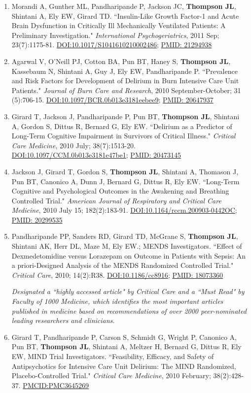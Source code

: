 \documentclass[5pt]{article}
\begin{document}
\begin{enumerate}
\item Morandi A, Gunther ML, Pandharipande P, Jackson JC, \textbf{Thompson JL}, Shintani A, Ely EW, Girard TD. ``Insulin-Like Growth Factor-1 and Acute Brain Dysfunction in Critically Ill Mechanically Ventilated Patients: A Preliminary Investigation." \emph{International Psychogeriatrics}, 2011 Sep; 23(7):1175-81. \href{https://doi.org/10.1017/S1041610210002486}{DOI:10.1017/S1041610210002486}; \href{https://www.ncbi.nlm.nih.gov/pubmed/21294938}{PMID: 21294938}
\item Agarwal V, O'Neill PJ, Cotton BA, Pun BT, Haney S, \textbf{Thompson JL}, Kassebaum N, Shintani A, Guy J, Ely EW, Pandharipande P. ``Prevalence and Risk Factors for Development of Delirium in Burn Intensive Care Unit Patients." \emph{Journal of Burn Care and Research}, 2010 September-October; 31 (5):706-15. \href{https://doi.org/10.1097/BCR.0b013e3181eebee9}{DOI:10.1097/BCR.0b013e3181eebee9}; \href{https://www.ncbi.nlm.nih.gov/pubmed/20647937}{PMID: 20647937}
\item Girard T, Jackson J, Pandharipande P, Pun BT, \textbf{Thompson JL}, Shintani A, Gordon S, Dittus R, Bernard G, Ely EW. ``Delirium as a Predictor of Long-Term Cognitive Impairment in Survivors of Critical Illness." \emph{Critical Care Medicine}, 2010 July; 38(7):1513-20. \href{https://doi.org/10.1097/CCM.0b013e3181e47be1}{DOI:10.1097/CCM.0b013e3181e47be1}; \href{https://www.ncbi.nlm.nih.gov/pubmed/20473145}{PMID: 20473145}
\item Jackson J, Girard T, Gordon S, \textbf{Thompson JL}, Shintani A, Thomason J, Pun BT, Canonico A, Dunn J, Bernard G, Dittus R, Ely EW. ``Long-Term Cognitive and Psychological Outcomes in the Awakening and Breathing Controlled Trial." \emph{American Journal of Respiratory and Critical Care Medicine}, 2010 July 15; 182(2):183-91. \href{https://doi.org/10.1164/rccm.200903-0442OC}{DOI:10.1164/rccm.200903-0442OC}; \href{https://www.ncbi.nlm.nih.gov/pubmed/20299535}{PMID: 20299535}
\item Pandharipande PP, Sanders RD, Girard TD, McGrane S, \textbf{Thompson JL}, Shintani AK, Herr DL, Maze M, Ely EW.; MENDS Investigators. ``Effect of Dexmedetomidine versus Lorazepam on Outcome in Patients with Sepsis: An a priori-Designed Analysis of the MENDS Randomized Controlled Trial." \emph{Critical Care}, 2010; 14(2):R38. \href{https://doi.org/10.1186/cc8916}{DOI:10.1186/cc8916}; \href{https://www.ncbi.nlm.nih.gov/pubmed/18073360}{PMID: 18073360}

    \emph{Designated a ``highly accessed article" by Critical Care and a ``Must Read" by Faculty of 1000 Medicine, which identifies the most important articles published in medicine based on recommendations of over 2000 peer-nominated leading researchers and clinicians.}
\item Girard T, Pandharipande P, Carson S, Schmidt G, Wright P, Canonico A, Pun BT, \textbf{Thompson JL}, Shintani A, Meltzer H, Bernard G, Dittus R, Ely EW, MIND Trial Investigators. ``Feasibility, Efficacy, and Safety of Antipsychotics for Intensive Care Unit Delirium: The MIND Randomized, Placebo-Controlled Trial." \emph{Critical Care Medicine}, 2010 February; 38(2):428-37. \href{https://www.ncbi.nlm.nih.gov/pmc/articles/PMC3645269/}{PMCID:PMC3645269}


\end{enumerate}
\end{document}
